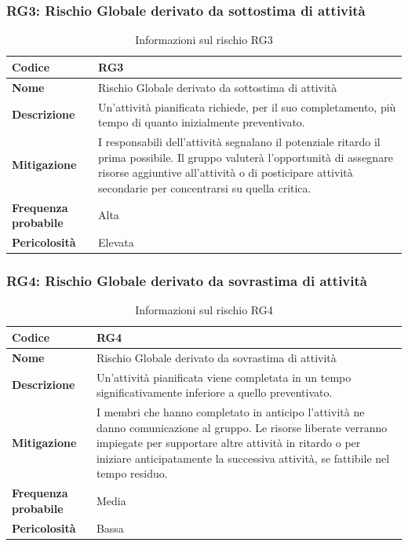 \documentclass[a4paper,12pt]{article}
\begin{document}
\subsubsection{RG3: Rischio Globale derivato da sottostima di attività}
\begin{table}[H]
\centering
\begin{tabular}{|>{\raggedright\arraybackslash}p{4cm}|>{\raggedright\arraybackslash}p{10cm}|}
\hline
\textbf{Codice} & RG3 \\
\hline
\textbf{Nome} & Rischio Globale derivato da sottostima di attività \\
\hline
\textbf{Descrizione} & Un'attività pianificata richiede, per il suo completamento, più tempo di quanto inizialmente preventivato. \\
\hline
\textbf{Mitigazione} & I responsabili dell'attività segnalano il potenziale ritardo il prima possibile. Il gruppo valuterà l'opportunità di assegnare risorse aggiuntive all'attività o di posticipare attività secondarie per concentrarsi su quella critica. \\
\hline
\textbf{Frequenza probabile} & Alta \\
\hline
\textbf{Pericolosità} & Elevata \\
\hline
\end{tabular}
\caption{Informazioni sul rischio RG3}
\label{tab:rg3}
\end{table}

\subsubsection{RG4: Rischio Globale derivato da sovrastima di attività}
\begin{table}[H]
\centering
\begin{tabular}{|>{\raggedright\arraybackslash}p{4cm}|>{\raggedright\arraybackslash}p{10cm}|}
\hline
\textbf{Codice} & RG4 \\
\hline
\textbf{Nome} & Rischio Globale derivato da sovrastima di attività \\
\hline
\textbf{Descrizione} & Un'attività pianificata viene completata in un tempo significativamente inferiore a quello preventivato. \\
\hline
\textbf{Mitigazione} & I membri che hanno completato in anticipo l'attività ne danno comunicazione al gruppo. Le risorse liberate verranno impiegate per supportare altre attività in ritardo o per iniziare anticipatamente la successiva attività, se fattibile nel tempo residuo. \\
\hline
\textbf{Frequenza probabile} & Media \\
\hline
\textbf{Pericolosità} & Bassa \\
\hline
\end{tabular}
\caption{Informazioni sul rischio RG4}
\label{tab:rg4}
\end{table}
\end{document}
